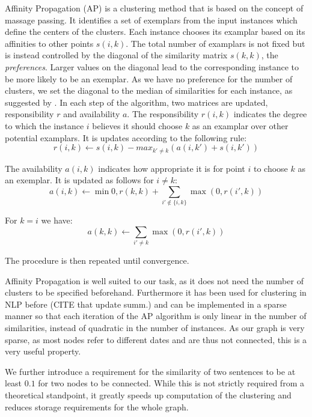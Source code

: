 \documentclass[a4paper,BCOR=10mm]{report}
\begin{document}
Affinity Propagation (AP) \citep{ap} is a clustering method that is based on the concept of massage passing. It identifies a set of exemplars from the input instances which define the centers of the clusters. Each instance chooses its examplar based on its affinities to other points $s(i, k)$.
The total number of examplars is not fixed but is instead controlled by the diagonal of the similarity matrix $s(k, k)$, the \textit{preferences}. Larger values on the diagonal lead to the corresponding instance to be more likely to be an exemplar.
As we have no preference for the number of clusters, we set the diagonal to the median of similarities for each instance, as suggested by \citeauthor{ap}.
In each step of the algorithm, two matrices are updated, responsibility $r$ and availability $a$. The responsibility $r(i, k)$ indicates the degree to which the instance $i$ believes it should choose $k$ as an examplar over other potential examplars. It is updates according to the following rule:
\begin{displaymath}
r(i, k) \leftarrow s(i, k) - max_{k' \neq k}( a(i, k') + s(i, k') )
\end{displaymath}

The availability $a(i, k)$ indicates how appropriate it is for point $i$ to choose $k$ as an exemplar.
It is updated as follows for $i \neq k$:
\begin{displaymath}
a(i, k) \leftarrow \min 0, r(k, k) + \sum_{i' \not\in \{i, k\}} \max(0, r(i', k))
\end{displaymath}

For $k = i$ we have:
\begin{displaymath}
a(k, k) \leftarrow \sum_{i' \neq k} \max(0, r(i', k))
\end{displaymath}

The procedure is then repeated until convergence.

Affinity Propagation is well suited to our task, as it does not need the number of clusters to be specified beforehand. Furthermore it has been used for clustering in NLP before (CITE that update summ.) and can be implemented in a sparse manner so that each iteration of the AP algorithm is only linear in the number of similarities, instead of quadratic in the number of instances.
As our graph is very sparse, as most nodes refer to different dates and are thus not connected, this is a very useful property.

We further introduce a requirement for the similarity of two sentences to be at least $0.1$ for two nodes to be connected. While this is not strictly required from a theoretical standpoint, it greatly speeds up computation of the clustering and reduces storage requirements for the whole graph.
\end{document}
